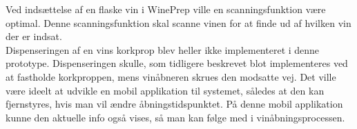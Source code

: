 Ved indsættelse af en flaske vin i WinePrep ville en scanningsfunktion være optimal. Denne scanningsfunktion skal scanne vinen 
for at finde ud af hvilken vin der er indsat. 
\\
Dispenseringen af en vins korkprop blev heller ikke implementeret i denne prototype. Dispenseringen skulle, som tidligere 
beskrevet blot implementeres ved at fastholde korkproppen, mens vinåbneren skrues den modsatte vej.
Det ville være ideelt at udvikle en mobil applikation til systemet, således at den kan fjernstyres, hvis man vil ændre 
åbningstidspunktet. På denne mobil applikation kunne den aktuelle info også vises, så man kan følge med i vinåbningsprocessen.
